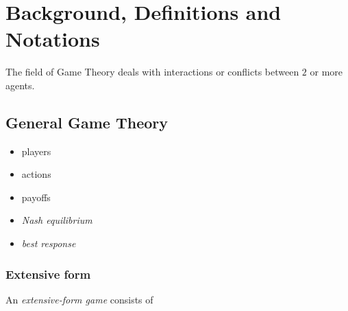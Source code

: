 \chapter{Background, Definitions and Notations}

The field of Game Theory deals with interactions or conflicts between $2$ or more agents.
\todo

\section{General Game Theory}

\begin{itemize}
  \item players
  \item actions
  \item payoffs
  \item \emph{Nash equilibrium}
  \item \emph{best response}
\end{itemize}

\subsection{Extensive form}

An \emph{extensive-form game} consists of

